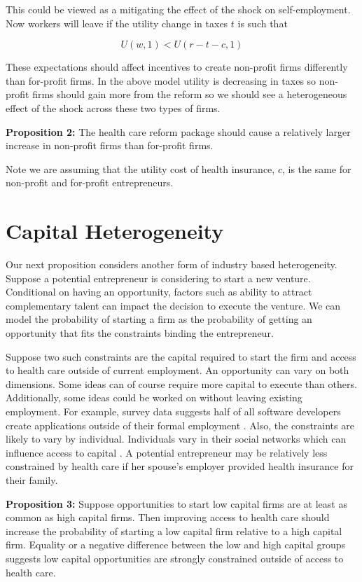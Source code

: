 This could be viewed as a mitigating the effect of the shock on self-employment. Now workers will leave if the utility change in taxes $t$ is such that

$$U(w,1) < U(r-t-c,1)$$

These expectations should affect incentives to create non-profit firms differently than for-profit firms. In the above model utility is decreasing in taxes so non-profit firms should gain more from the reform so we should see a heterogeneous effect of the shock across these two types of firms.  

\textbf{Proposition 2:} 
The health care reform package should cause a relatively larger increase in non-profit firms than for-profit firms. 

Note we are assuming that the utility cost of health insurance, $c$, is the same for non-profit and for-profit entrepreneurs.  

\section{Capital Heterogeneity}

Our next proposition considers another form of industry based heterogeneity. Suppose a potential entrepreneur is considering to start a new venture. Conditional on having an opportunity, factors such as ability to attract complementary talent \cite{stuartSorensen} can impact the decision to execute the venture. We can model the probability of starting a firm as the probability of getting an opportunity that fits the constraints binding the entrepreneur. 

Suppose two such constraints are the capital required to start the firm and access to health care  outside of current employment. An opportunity can vary on both dimensions. Some ideas can of course require more capital to execute than others. Additionally, some ideas could be worked on without leaving existing employment. For example, survey data suggests half of all software developers create applications outside of their formal employment \cite{evans}. Also, the constraints are likely to vary by individual. Individuals vary in their social networks which can influence access to capital \cite{uzzi}. A potential entrepreneur may be relatively less constrained by health care if her spouse's employer provided health insurance for their family. 

\textbf{Proposition 3:} 
Suppose opportunities to start low capital firms are at least as common as high capital firms. Then improving access to health care should increase the probability of starting a low capital firm relative to a high capital firm. Equality or a negative difference between the low and high capital groups suggests low capital opportunities are strongly constrained outside of access to health care. 

